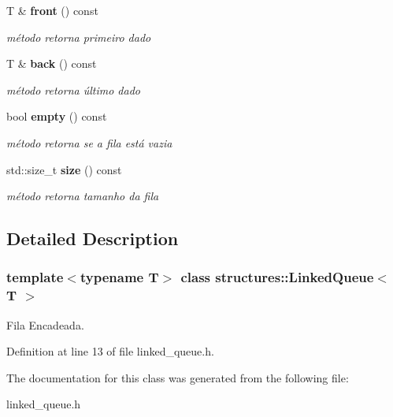 \begin{DoxyCompactItemize}
\mbox{\label{classstructures_1_1_linked_queue_a904219098f1f6b3aa229a8ea0f929b64}} 
T \& \textbf{ front} () const
\begin{DoxyCompactList}\small\item\em método retorna primeiro dado \end{DoxyCompactList}\item 
\mbox{\label{classstructures_1_1_linked_queue_ac69ee50f58e8501f7eaddec5b474a87c}} 
T \& \textbf{ back} () const
\begin{DoxyCompactList}\small\item\em método retorna último dado \end{DoxyCompactList}\item 
\mbox{\label{classstructures_1_1_linked_queue_a24995d6b61ce9e8d05718c966b699c5a}} 
bool \textbf{ empty} () const
\begin{DoxyCompactList}\small\item\em método retorna se a fila está vazia \end{DoxyCompactList}\item 
\mbox{\label{classstructures_1_1_linked_queue_ab86b0d95b796c277a21b89f106efd173}} 
std\+::size\+\_\+t \textbf{ size} () const
\begin{DoxyCompactList}\small\item\em método retorna tamanho da fila \end{DoxyCompactList}\end{DoxyCompactItemize}


\subsection{Detailed Description}
\subsubsection*{template$<$typename T$>$\newline
class structures\+::\+Linked\+Queue$<$ T $>$}

Fila Encadeada. 

Definition at line 13 of file linked\+\_\+queue.\+h.



The documentation for this class was generated from the following file\+:\begin{DoxyCompactItemize}
\item 
linked\+\_\+queue.\+h\end{DoxyCompactItemize}
